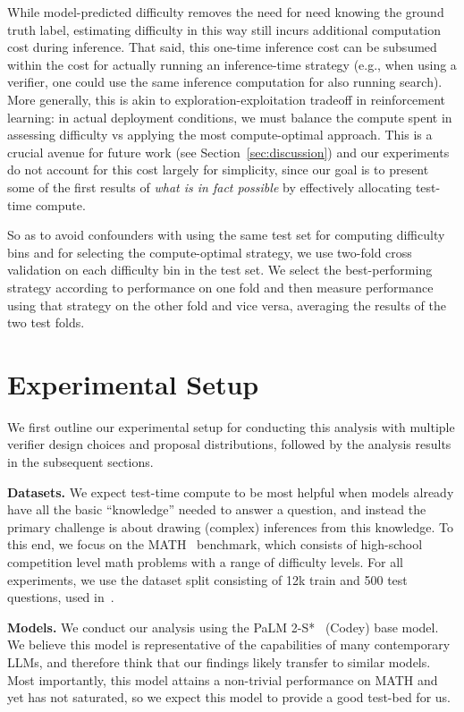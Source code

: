 \documentclass[11pt, letterpaper, logo]{googledeepmind}
\begin{document}
While model-predicted difficulty removes the need for need knowing the ground truth label, estimating difficulty in this way still incurs additional computation cost during inference. That said, this one-time inference cost can be subsumed within the cost for actually running an inference-time strategy (e.g., when using a verifier, one could use the same inference computation for also running search). More generally, this is akin to exploration-exploitation tradeoff in reinforcement learning: in actual deployment conditions, we must balance the compute spent in assessing difficulty vs applying the most compute-optimal approach. This is a crucial avenue for future work (see Section~\ref{sec:discussion}) and our experiments do not account for this cost largely for simplicity, since our goal is to present some of the first results of \emph{what is in fact possible} by effectively allocating test-time compute.

So as to avoid confounders with using the same test set for computing difficulty bins and for selecting the compute-optimal strategy, we use two-fold cross validation on each difficulty bin in the test set. We select the best-performing strategy according to performance on one fold and then measure performance using that strategy on the other fold and vice versa, averaging the results of the two test folds.

\vspace{-0.2cm}
\section{Experimental Setup}
\label{sec:setup}
\vspace{-0.2cm}
We first outline our experimental setup for conducting this analysis with multiple verifier design choices and proposal distributions, followed by the analysis results in the subsequent sections.

\textbf{Datasets.} We expect test-time compute to be most helpful when models already have all the basic ``knowledge'' needed to answer a question, and instead the primary challenge is about drawing (complex) inferences from this knowledge. To this end, we focus on the MATH~\citep{hendrycks2021measuring} benchmark, which consists of high-school competition level math problems with a range of difficulty levels. For all experiments, we use the dataset split consisting of 12k train and 500 test questions, used in~\citet{lightman2023lets}.

\textbf{Models.} We conduct our analysis using the PaLM 2-S*~\citep{anil2023palm} (Codey) base model. We believe this model is representative of the capabilities of many contemporary LLMs, and therefore think that our findings likely transfer to similar models. Most importantly, this model attains a non-trivial performance on MATH and yet has not saturated, so we expect this model to provide a good test-bed for us.
\end{document}
